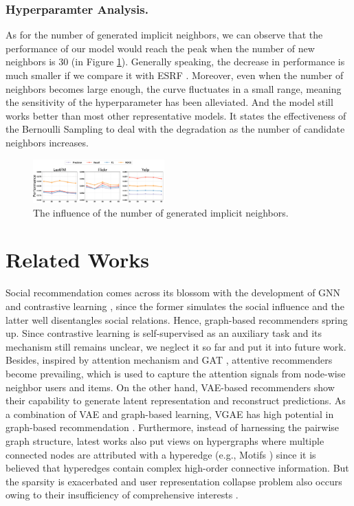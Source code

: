 \documentclass[letterpaper]{article} %
\begin{document}
\subsubsection{Hyperparamter Analysis.}
As for the number of generated implicit neighbors, we can observe that the performance of our model would reach the peak when the number of new neighbors is 30 (in Figure \ref{fig_hyper}). Generally speaking, the decrease in performance is much smaller if we compare it with ESRF \cite{ESRF}. Moreover, even when the number of neighbors becomes large enough, the curve fluctuates in a small range, meaning the sensitivity of the hyperparameter has been alleviated. And the model still works better than most other representative models. It states the effectiveness of the Bernoulli Sampling to deal with the degradation as the number of candidate neighbors increases.
\begin{figure}[ht!]
  \centering
  \includegraphics[width=0.45\textwidth]{hyper.pdf} %
  \caption{The influence of the number of generated implicit neighbors.}
  \label{fig_hyper}
\end{figure}

\section{Related Works}
Social recommendation comes across its blossom with the development of GNN \cite{GNN, MPNN, graphsage} and contrastive learning \cite{sgl}, since the former simulates the social influence and the latter well disentangles social relations. Hence, graph-based recommenders \cite{ngcf,lightgcn} spring up. Since contrastive learning is self-supervised as an auxiliary task and its mechanism still remains unclear\cite{augmentation}, we neglect it so far and put it into future work. Besides, inspired by attention mechanism \cite{attention} and GAT \cite{GAT}, attentive recommenders \cite{diffnet++} become prevailing, which is used to capture the attention signals from node-wise neighbor users and items. On the other hand, VAE-based recommenders \cite{multivae,jova} show their capability to generate latent representation and reconstruct predictions. As a combination of VAE and graph-based learning, VGAE \cite{VGAE} has high potential in graph-based recommendation \cite{vgae_rec}. Furthermore, instead of harnessing the pairwise graph structure, latest works \cite{MHCN, ESRF} also put views on hypergraphs where multiple connected nodes are attributed with a hyperedge (e.g., Motifs \cite{motif}) since it is believed that hyperedges contain complex high-order connective information. But the sparsity is exacerbated and user representation collapse problem also occurs owing to their insufficiency of comprehensive interests \cite{collapse}.
\end{document}
